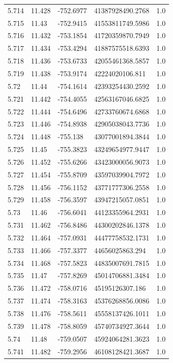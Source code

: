 \begin{tabular}{lllll}
5.714 & 11.428 & -752.6977 & 41387928490.2768 & 1.0 \\
5.715 & 11.43 & -752.9415 & 41553811749.5986 & 1.0 \\
5.716 & 11.432 & -753.1854 & 41720359870.7949 & 1.0 \\
5.717 & 11.434 & -753.4294 & 41887575518.6393 & 1.0 \\
5.718 & 11.436 & -753.6733 & 42055461368.5857 & 1.0 \\
5.719 & 11.438 & -753.9174 & 42224020106.811 & 1.0 \\
5.72 & 11.44 & -754.1614 & 42393254430.2592 & 1.0 \\
5.721 & 11.442 & -754.4055 & 42563167046.6825 & 1.0 \\
5.722 & 11.444 & -754.6496 & 42733760674.6868 & 1.0 \\
5.723 & 11.446 & -754.8938 & 42905038043.7736 & 1.0 \\
5.724 & 11.448 & -755.138 & 43077001894.3844 & 1.0 \\
5.725 & 11.45 & -755.3823 & 43249654977.9447 & 1.0 \\
5.726 & 11.452 & -755.6266 & 43423000056.9073 & 1.0 \\
5.727 & 11.454 & -755.8709 & 43597039904.7972 & 1.0 \\
5.728 & 11.456 & -756.1152 & 43771777306.2558 & 1.0 \\
5.729 & 11.458 & -756.3597 & 43947215057.0851 & 1.0 \\
5.73 & 11.46 & -756.6041 & 44123355964.2931 & 1.0 \\
5.731 & 11.462 & -756.8486 & 44300202846.1378 & 1.0 \\
5.732 & 11.464 & -757.0931 & 44477758532.1731 & 1.0 \\
5.733 & 11.466 & -757.3377 & 44656025863.294 & 1.0 \\
5.734 & 11.468 & -757.5823 & 44835007691.7815 & 1.0 \\
5.735 & 11.47 & -757.8269 & 45014706881.3484 & 1.0 \\
5.736 & 11.472 & -758.0716 & 45195126307.186 & 1.0 \\
5.737 & 11.474 & -758.3163 & 45376268856.0086 & 1.0 \\
5.738 & 11.476 & -758.5611 & 45558137426.1011 & 1.0 \\
5.739 & 11.478 & -758.8059 & 45740734927.3644 & 1.0 \\
5.74 & 11.48 & -759.0507 & 45924064281.3623 & 1.0 \\
5.741 & 11.482 & -759.2956 & 46108128421.3687 & 1.0 \\

\end{tabular}

